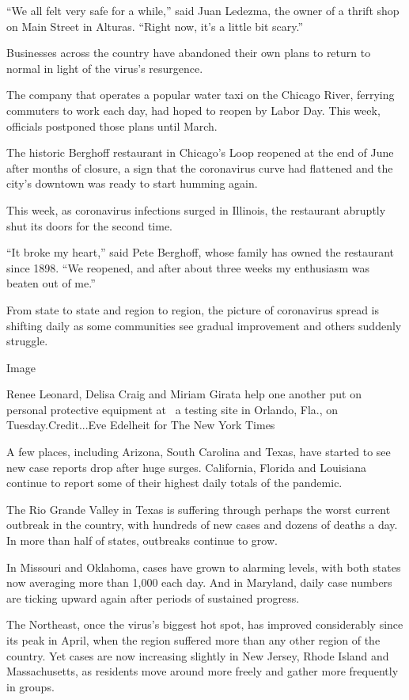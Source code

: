 ``We all felt very safe for a while,'' said Juan Ledezma, the owner of a
thrift shop on Main Street in Alturas. ``Right now, it's a little bit
scary.''

Businesses across the country have abandoned their own plans to return
to normal in light of the virus's resurgence.

The company that operates a popular water taxi on the Chicago River,
ferrying commuters to work each day, had hoped to reopen by Labor Day.
This week, officials postponed those plans until March.

The historic Berghoff restaurant in Chicago's Loop reopened at the end
of June after months of closure, a sign that the coronavirus curve had
flattened and the city's downtown was ready to start humming again.

This week, as coronavirus infections surged in Illinois, the restaurant
abruptly shut its doors for the second time.

``It broke my heart,'' said Pete Berghoff, whose family has owned the
restaurant since 1898. ``We reopened, and after about three weeks my
enthusiasm was beaten out of me.''

From state to state and region to region, the picture of coronavirus
spread is shifting daily as some communities see gradual improvement and
others suddenly struggle.

Image

Renee Leonard, Delisa Craig and Miriam Girata help one another put on
personal protective equipment at~ a testing site in Orlando, Fla., on
Tuesday.Credit...Eve Edelheit for The New York Times

A few places, including Arizona, South Carolina and Texas, have started
to see new case reports drop after huge surges. California, Florida and
Louisiana continue to report some of their highest daily totals of the
pandemic.

The Rio Grande Valley in Texas is suffering through perhaps the worst
current outbreak in the country, with hundreds of new cases and dozens
of deaths a day. In more than half of states, outbreaks continue to
grow.

In Missouri and Oklahoma, cases have grown to alarming levels, with both
states now averaging more than 1,000 each day. And in Maryland, daily
case numbers are ticking upward again after periods of sustained
progress.

The Northeast, once the virus's biggest hot spot, has improved
considerably since its peak in April, when the region suffered more than
any other region of the country. Yet cases are now increasing slightly
in New Jersey, Rhode Island and Massachusetts, as residents move around
more freely and gather more frequently in groups.

